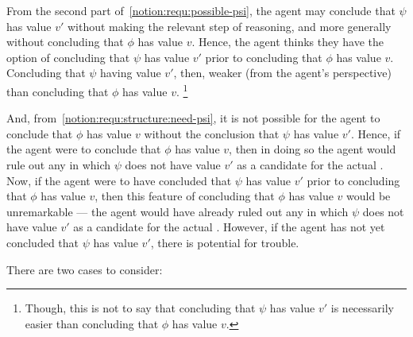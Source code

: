 \begin{note}[\ref{notion:requ:structure:psi}]
  From the second part of~\ref{notion:requ:possible-psi}, the agent may conclude that \(\psi\) has value \(v'\) without making the relevant step of reasoning, and more generally without concluding that \(\phi\) has value \(v\).
  Hence, the agent thinks they have the option of concluding that \(\psi\) has value \(v'\) prior to concluding that \(\phi\) has value \(v\).
  Concluding that \(\psi\) having value \(v'\), then, weaker (from the agent's perspective) than concluding that \(\phi\) has value \(v\).\nolinebreak
  \footnote{
    Though, this is not to say that concluding that \(\psi\) has value \(v'\) is necessarily easier than concluding that \(\phi\) has value \(v\).
  }

  And, from~\ref{notion:requ:structure:need-psi}, it is not possible for the agent to conclude that \(\phi\) has value \(v\) without the conclusion \indicateV{} that \(\psi\) has value \(v'\).
  Hence, if the agent were to conclude that \(\phi\) has value \(v\), then in doing so the agent would rule out any \world{} in which \(\psi\) does not have value \(v'\) as a candidate for the actual \world{}.
  Now, if the agent were to have concluded that \(\psi\) has value \(v'\) prior to concluding that \(\phi\) has value \(v\), then this feature of concluding that \(\phi\) has value \(v\) would be unremarkable --- the agent would have already ruled out any \world{} in which \(\psi\) does not have value \(v'\) as a candidate for the actual \world{}.
  However, if the agent has not yet concluded that \(\psi\) has value \(v'\), there is potential for trouble.

  There are two cases to consider:
\end{note}

